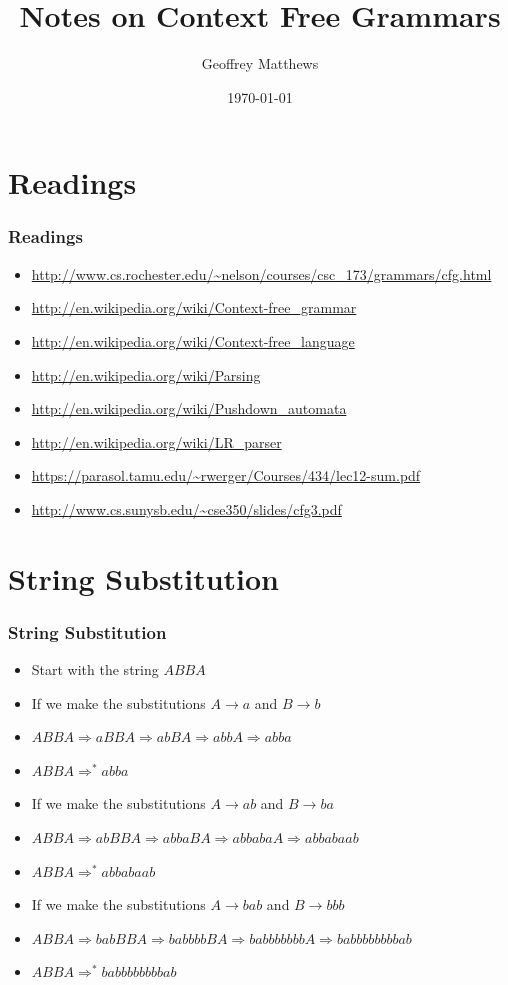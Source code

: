 \documentclass{beamer}
\title[Notes on Context Free Grammars]
{
Notes on Context Free Grammars
}
\subtitle{} %
\author[Geoffrey Matthews]
{Geoffrey Matthews}
\institute[WWU/CS]
{
  Department of Computer Science\\
  Western Washington University
}
\date{\today}
\newcommand{\ar}{\rightarrow}
\newcommand{\dar}{\Rightarrow}
\newcommand{\bi}{\begin{itemize}}
\newcommand{\li}{\item}
\newcommand{\ei}{\end{itemize}}
\newcommand{\sect}[1]{
\section{#1}
\begin{frame}[fragile]\frametitle{#1}
}
\begin{document}
\begin{frame}
  \titlepage
\end{frame}


\newcommand{\myref}[1]{\small\item\url{#1}}
\newcommand{\myreft}[1]{\footnotesize\item\url{#1}}


\sect{Readings}

\begin{itemize}

\myreft{http://www.cs.rochester.edu/~nelson/courses/csc_173/grammars/cfg.html}

\myreft{http://en.wikipedia.org/wiki/Context-free_grammar}

\myreft{http://en.wikipedia.org/wiki/Context-free_language}
\myreft{http://en.wikipedia.org/wiki/Parsing}

\myreft{http://en.wikipedia.org/wiki/Pushdown_automata}
\myreft{http://en.wikipedia.org/wiki/LR_parser}
\myreft{https://parasol.tamu.edu/~rwerger/Courses/434/lec12-sum.pdf}
\myreft{http://www.cs.sunysb.edu/~cse350/slides/cfg3.pdf}
\end{itemize}

\end{frame}

\sect{String Substitution}

\bi
\li Start with the string $ABBA$

\li If we make the substitutions $A\ar a$ and $B\ar b$
\li $ABBA \dar aBBA \dar abBA \dar abbA \dar abba$
\li $ABBA \dar^*  abba$

\li If we make the substitutions $A\ar ab$ and $B\ar ba$
\li  $ABBA \dar abBBA \dar abbaBA \dar abbabaA \dar abbabaab$
\li  $ABBA \dar^* abbabaab$

\li If we make the substitutions $A\ar bab$ and $B\ar bbb$
\li  $ABBA \dar babBBA \dar babbbbBA \dar babbbbbbbA \dar babbbbbbbbab$
\li  $ABBA \dar^* babbbbbbbbab$

\ei

\end{frame}
\end{document}
